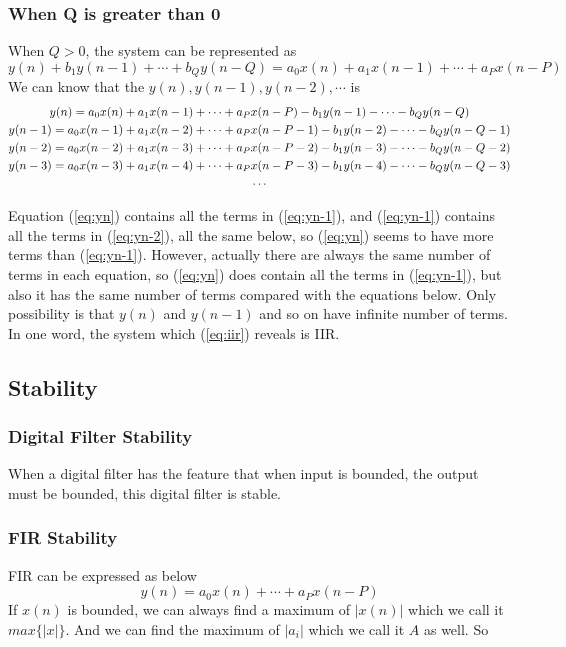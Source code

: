 \documentclass{article}
\begin{document}
\subsubsection{When Q is greater than 0}
When $Q > 0$, the system can be represented as 
\begin{equation}
y(n) + b_1 y(n - 1) + \cdots + b_Q y(n - Q) = a_0 x(n) + a_1 x(n - 1) + \cdots + a_P x(n - P)
\label{eq:iir}
\end{equation}
We can know that the $y(n), y(n - 1), y(n - 2), \cdots $ is 
\begin{gather}
y(n) = a_0 x(n) + a_1 x(n - 1) + \cdots + a_P x(n - P) - b_1 y(n - 1) - \cdots - b_Q y(n - Q) \label{eq:yn} \\ 
y(n - 1) = a_0 x(n - 1) + a_1 x(n - 2) + \cdots + a_P x(n - P - 1) - b_1 y(n - 2) - \cdots - b_Q y(n - Q - 1) \label{eq:yn-1} \\ 
y(n - 2) = a_0 x(n - 2) + a_1 x(n - 3) + \cdots + a_P x(n - P - 2) - b_1 y(n - 3) - \cdots - b_Q y(n - Q - 2) \label{eq:yn-2} \\ 
y(n - 3) = a_0 x(n - 3) + a_1 x(n - 4) + \cdots + a_P x(n - P - 3) - b_1 y(n - 4) - \cdots - b_Q y(n - Q - 3) \notag \\ 
\cdots \notag
\end{gather}

Equation (\ref{eq:yn}) contains all the terms in (\ref{eq:yn-1}), and (\ref{eq:yn-1}) contains all the terms in (\ref{eq:yn-2}), all the same below, so (\ref{eq:yn}) seems to have more terms than (\ref{eq:yn-1}). However, actually there are always the same number of terms in each equation, so (\ref{eq:yn}) does contain all the terms in (\ref{eq:yn-1}), but also it has the same number of terms compared with the equations below. Only possibility is that $y(n)$ and $y(n - 1)$ and so on have infinite number of terms. In one word, the system which (\ref{eq:iir}) reveals is IIR.
\subsection{Stability}
\subsubsection{Digital Filter Stability}
When a digital filter has the feature that when input is bounded, the output must be bounded, this digital filter is stable.
\subsubsection{FIR Stability}
FIR can be expressed as below
$$
y(n) = a_0x(n) + \cdots + a_Px(n - P)
$$
If $x(n)$ is bounded, we can always find a maximum of $|x(n)|$ which we call it $max\{ |x| \}$. And we can find the maximum of $|a_i|$ which we call it $A$ as well. So
\end{document}
